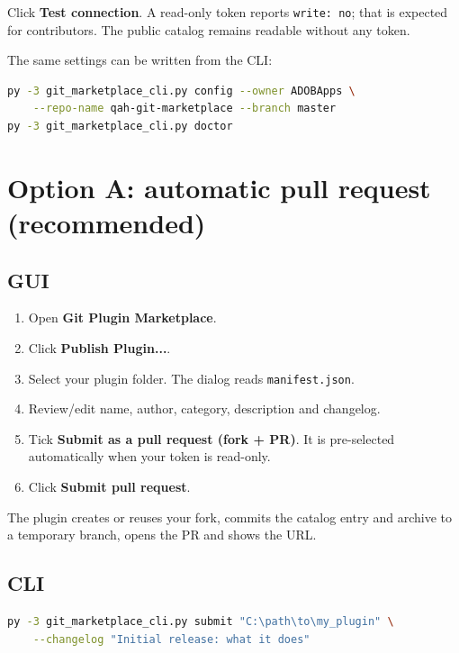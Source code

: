 \documentclass[11pt,a4paper]{article}
\newcommand{\code}[1]{\texttt{#1}}
\begin{document}
Click \textbf{Test connection}. A read-only token reports \code{write: no}; that
is expected for contributors. The public catalog remains readable without any
token.

The same settings can be written from the CLI:

\begin{lstlisting}[language=bash,caption={CLI configuration}]
py -3 git_marketplace_cli.py config --owner ADOBApps \
    --repo-name qah-git-marketplace --branch master
py -3 git_marketplace_cli.py doctor
\end{lstlisting}

\section{Option A: automatic pull request (recommended)}

\subsection{GUI}

\begin{enumerate}[leftmargin=1.5em]
  \item Open \textbf{Git Plugin Marketplace}.
  \item Click \textbf{Publish Plugin...}.
  \item Select your plugin folder. The dialog reads \code{manifest.json}.
  \item Review/edit name, author, category, description and changelog.
  \item Tick \textbf{Submit as a pull request (fork + PR)}.
        It is pre-selected automatically when your token is read-only.
  \item Click \textbf{Submit pull request}.
\end{enumerate}

The plugin creates or reuses your fork, commits the catalog entry and archive to
a temporary branch, opens the PR and shows the URL.

\subsection{CLI}

\begin{lstlisting}[language=bash,caption={Automatic submission}]
py -3 git_marketplace_cli.py submit "C:\path\to\my_plugin" \
    --changelog "Initial release: what it does"
\end{lstlisting}
\end{document}
